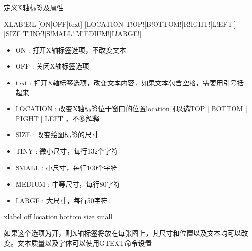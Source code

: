 \label{cmd:xlabel}

定义X轴标签及属性

\begin{SACSTX}
XLAB!E!L [ON|OFF|text] [LOCATION T!OP!|B!OTTOM!|R!IGHT!|L!EFT!] 
    [SIZE T!INY!|S!MALL!|M!EDIUM!|L!ARGE!]
\end{SACSTX}

\begin{itemize}
\item ON : 打开X轴标签选项，不改变文本 
\item OFF : 关闭X轴标签选项 
\item text : 打开X轴标签选项，改变文本内容，如果文本包含空格，需要用引号括起来
\item LOCATION : 改变X轴标签位于窗口的位置location可以选TOP | BOTTOM | RIGHT | LEFT ，不多解释
\item SIZE :  改变绘图标签的尺寸 
\item TINY : 微小尺寸，每行132个字符
\item SMALL :  小尺寸，每行100个字符 
\item MEDIUM : 中等尺寸，每行80字符 
\item LARGE : 大尺寸，每行50字符 
\end{itemize}

\begin{SACDFT}
xlabel off location bottom size small
\end{SACDFT}

如果这个选项为开，则X轴标签将放在每张图上，其尺寸和位置以及文本均可以改变。文本质量以及字体可以使用GTEXT命令设置

